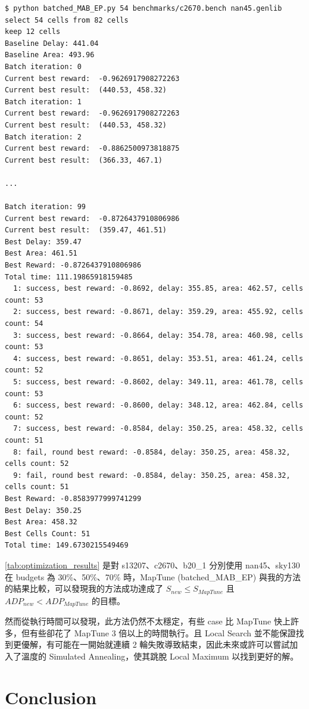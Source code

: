 \documentclass[12pt]{article}
\begin{document}
\begin{lstlisting}
$ python batched_MAB_EP.py 54 benchmarks/c2670.bench nan45.genlib
select 54 cells from 82 cells
keep 12 cells
Baseline Delay: 441.04
Baseline Area: 493.96
Batch iteration: 0
Current best reward:  -0.9626917908272263
Current best result:  (440.53, 458.32)
Batch iteration: 1
Current best reward:  -0.9626917908272263
Current best result:  (440.53, 458.32)
Batch iteration: 2
Current best reward:  -0.8862500973818875
Current best result:  (366.33, 467.1)

...

Batch iteration: 99
Current best reward:  -0.8726437910806986
Current best result:  (359.47, 461.51)
Best Delay: 359.47
Best Area: 461.51
Best Reward: -0.8726437910806986
Total time: 111.19865918159485
  1: success, best reward: -0.8692, delay: 355.85, area: 462.57, cells count: 53
  2: success, best reward: -0.8671, delay: 359.29, area: 455.92, cells count: 54
  3: success, best reward: -0.8664, delay: 354.78, area: 460.98, cells count: 53
  4: success, best reward: -0.8651, delay: 353.51, area: 461.24, cells count: 52
  5: success, best reward: -0.8602, delay: 349.11, area: 461.78, cells count: 53
  6: success, best reward: -0.8600, delay: 348.12, area: 462.84, cells count: 52
  7: success, best reward: -0.8584, delay: 350.25, area: 458.32, cells count: 51
  8: fail, round best reward: -0.8584, delay: 350.25, area: 458.32, cells count: 52
  9: fail, round best reward: -0.8584, delay: 350.25, area: 458.32, cells count: 51
Best Reward: -0.8583977999741299
Best Delay: 350.25
Best Area: 458.32
Best Cells Count: 51
Total time: 149.6730215549469
\end{lstlisting}

\autoref{tab:optimization_results} 是對 s13207、c2670、b20\_1 分別使用 nan45、sky130 在 budgets 為 30\%、50\%、70\% 時，MapTune (batched\_MAB\_EP) 與我的方法的結果比較，可以發現我的方法成功達成了 $S_{new} \le S_{MapTune}$ 且 $ADP_{new} < ADP_{MapTune}$ 的目標。

然而從執行時間可以發現，此方法仍然不太穩定，有些 case 比 MapTune 快上許多，但有些卻花了 MapTune 3 倍以上的時間執行。且 Local Search 並不能保證找到更優解，有可能在一開始就連續 2 輪失敗導致結束，因此未來或許可以嘗試加入了溫度的 Simulated Annealing，使其跳脫 Local Maximum 以找到更好的解。



\section*{Conclusion}
\end{document}

